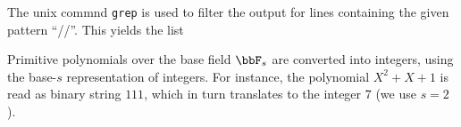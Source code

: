 
The unix commnd \verb'grep' is used to filter the output for 
lines containing the given pattern ``//''. 
This yields the list


Primitive polynomials over the base field $\bbF_s$ 
are converted into integers, using the base-$s$ representation of integers.
For instance, the polynomial $X^{2} + X + 1$ is read as binary string $111$, 
which in turn translates to the integer $7$ (we use $s=2$).


\bigskip

